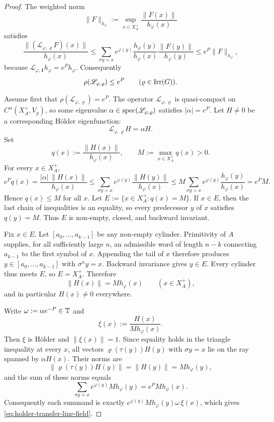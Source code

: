 \begin{proof}
  The weighted norm
  \[
    \|F\|_{h_\varphi}
    :=
    \sup_{x\in X_A^+}\frac{\|F(x)\|}{h_\varphi(x)}
  \]
  satisfies
  \[
    \frac{\|(\mathscr L_{\varphi,\varrho}F)(x)\|}{h_\varphi(x)}
    \le
    \sum_{\sigma y=x}
      e^{\varphi(y)}\frac{h_\varphi(y)}{h_\varphi(x)}
      \frac{\|F(y)\|}{h_\varphi(y)}
    \le
    e^P\|F\|_{h_\varphi},
  \]
  because \(\mathscr L_{\varphi,\mathbf 1}h_\varphi=e^P h_\varphi\).
  Consequently
  \[
    \rho(\mathscr L_{\varphi,\varrho})\le e^P
    \qquad (\varrho\in\operatorname{Irr}(G)).
  \]

  Assume first that \(\rho(\mathscr L_{\varphi,\varrho})=e^P\). The
  operator \(\mathscr L_{\varphi,\varrho}\) is quasi-compact on
  \(C^\alpha(X_A^+,V_\varrho)\), so some eigenvalue
  \(\alpha\in\operatorname{spec}(\mathscr L_{\varphi,\varrho})\) satisfies
  \(|\alpha|=e^P\). Let \(H\neq 0\) be a corresponding H\"older
  eigenfunction:
  \[
    \mathscr L_{\varphi,\varrho}H=\alpha H.
  \]
  Set
  \[
    q(x):=\frac{\|H(x)\|}{h_\varphi(x)},
    \qquad
    M:=\max_{x\in X_A^+}q(x)>0.
  \]
  For every \(x\in X_A^+\),
  \[
    e^P q(x)
    =
    \frac{|\alpha|\,\|H(x)\|}{h_\varphi(x)}
    \le
    \sum_{\sigma y=x}
      e^{\varphi(y)}\frac{\|H(y)\|}{h_\varphi(x)}
    \le
    M\sum_{\sigma y=x}
      e^{\varphi(y)}\frac{h_\varphi(y)}{h_\varphi(x)}
    =e^P M.
  \]
  Hence \(q(x)\le M\) for all \(x\). Let
  \(E:=\{x\in X_A^+:q(x)=M\}\). If \(x\in E\), then the last chain of
  inequalities is an equality, so every predecessor \(y\) of \(x\)
  satisfies \(q(y)=M\). Thus \(E\) is non-empty, closed, and backward
  invariant.

  Fix \(x\in E\). Let \([a_0,\dots,a_{k-1}]\) be any non-empty cylinder.
  Primitivity of \(A\) supplies, for all sufficiently large \(n\), an
  admissible word of length \(n-k\) connecting \(a_{k-1}\) to the first
  symbol of \(x\). Appending the tail of \(x\) therefore produces
  \(y\in[a_0,\dots,a_{k-1}]\) with \(\sigma^n y=x\). Backward invariance
  gives \(y\in E\). Every cylinder thus meets \(E\), so \(E=X_A^+\).
  Therefore
  \[
    \|H(x)\|=M h_\varphi(x)
    \qquad (x\in X_A^+),
  \]
  and in particular \(H(x)\neq 0\) everywhere.

  Write \(\omega:=\alpha e^{-P}\in\mathbb{T}\) and
  \[
    \xi(x):=\frac{H(x)}{M h_\varphi(x)}.
  \]
  Then \(\xi\) is H\"older and \(\|\xi(x)\|=1\). Since equality holds in
  the triangle inequality at every \(x\), all vectors
  \(\varrho(\tau(y))H(y)\) with \(\sigma y=x\) lie on the ray spanned by
  \(\alpha H(x)\). Their norms are
  \[
    \|\varrho(\tau(y))H(y)\|
    =\|H(y)\|
    =M h_\varphi(y),
  \]
  and the sum of these norms equals
  \[
    \sum_{\sigma y=x}e^{\varphi(y)}M h_\varphi(y)
    =e^P M h_\varphi(x).
  \]
  Consequently each summand is exactly
  \(e^{\varphi(y)}M h_\varphi(y)\omega\,\xi(x)\), which gives
  \eqref{eq:holder-transfer-line-field}.


\end{proof}
